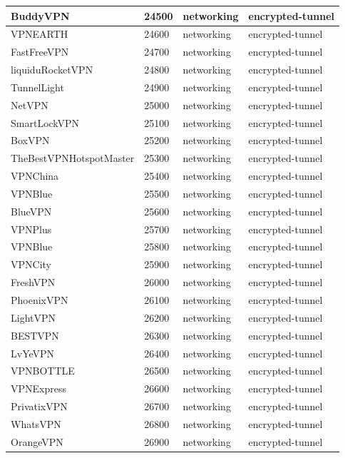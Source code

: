 \begin{longtable}{p{}|p{}|p{}|p{}}
    BuddyVPN &	24500 &	networking &	encrypted-tunnel \\ \hline
    VPNEARTH &	24600 &	networking &	encrypted-tunnel \\ \hline
    FastFreeVPN &	24700 &	networking &	encrypted-tunnel \\ \hline
    liquiduRocketVPN &	24800 &	networking &	encrypted-tunnel \\ \hline
    TunnelLight &	24900 &	networking &	encrypted-tunnel \\ \hline
    NetVPN &	25000 &	networking &	encrypted-tunnel \\ \hline
    SmartLockVPN &	25100 &	networking &	encrypted-tunnel \\ \hline
    BoxVPN &	25200 &	networking &	encrypted-tunnel \\ \hline
    TheBestVPNHotspotMaster &	25300 &	networking &	encrypted-tunnel \\ \hline
    VPNChina &	25400 &	networking &	encrypted-tunnel \\ \hline
    VPNBlue &	25500 &	networking &	encrypted-tunnel \\ \hline
    BlueVPN &	25600 &	networking &	encrypted-tunnel \\ \hline
    VPNPlus &	25700 &	networking &	encrypted-tunnel \\ \hline
    VPNBlue &	25800 &	networking &	encrypted-tunnel \\ \hline
    VPNCity &	25900 &	networking &	encrypted-tunnel \\ \hline
    FreshVPN &	26000 &	networking &	encrypted-tunnel \\ \hline
    PhoenixVPN &	26100 &	networking &	encrypted-tunnel \\ \hline
    LightVPN &	26200 &	networking &	encrypted-tunnel \\ \hline
    BESTVPN &	26300 &	networking &	encrypted-tunnel \\ \hline
    LvYeVPN &	26400 &	networking &	encrypted-tunnel \\ \hline
    VPNBOTTLE &	26500 &	networking &	encrypted-tunnel \\ \hline
    VPNExpress &	26600 &	networking &	encrypted-tunnel \\ \hline
    PrivatixVPN &	26700 &	networking &	encrypted-tunnel \\ \hline
    WhatsVPN &	26800 &	networking &	encrypted-tunnel \\ \hline
    OrangeVPN &	26900 &	networking &	encrypted-tunnel \\ \hline

\end{longtable}
